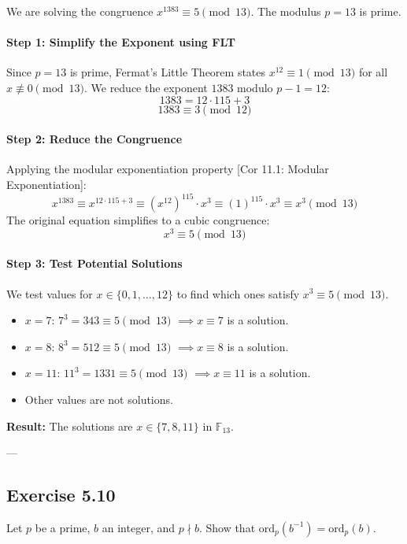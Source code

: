 \begin{solution}
We are solving the congruence $x^{1383} \equiv 5 \pmod{13}$. The modulus $p=13$ is prime.

\paragraph{Step 1: Simplify the Exponent using FLT}
Since $p=13$ is prime, Fermat's Little Theorem states $x^{12} \equiv 1 \pmod{13}$ for all $x \not\equiv 0 \pmod{13}$.
We reduce the exponent $1383$ modulo $p-1 = 12$:
$$ 1383 = 12 \cdot 115 + 3 $$
$$ 1383 \equiv 3 \pmod{12} $$

\paragraph{Step 2: Reduce the Congruence}
Applying the modular exponentiation property [Cor 11.1: Modular Exponentiation]:
$$ x^{1383} \equiv x^{12 \cdot 115 + 3} \equiv (x^{12})^{115} \cdot x^3 \equiv (1)^{115} \cdot x^3 \equiv x^3 \pmod{13} $$
The original equation simplifies to a cubic congruence:
$$ x^3 \equiv 5 \pmod{13} $$

\paragraph{Step 3: Test Potential Solutions}
We test values for $x \in \{0, 1, \dots, 12\}$ to find which ones satisfy $x^3 \equiv 5 \pmod{13}$.
\begin{itemize}
    \item $x=7$: $7^3 = 343 \equiv 5 \pmod{13}$ $\implies x \equiv 7$ is a solution.
    \item $x=8$: $8^3 = 512 \equiv 5 \pmod{13}$ $\implies x \equiv 8$ is a solution.
    \item $x=11$: $11^3 = 1331 \equiv 5 \pmod{13}$ $\implies x \equiv 11$ is a solution.
    \item Other values are not solutions.
\end{itemize}
\textbf{Result:} The solutions are $x \in \{7, 8, 11\}$ in $\mathbb{F}_{13}$.
\end{solution}

---
\subsection*{Exercise 5.10}
Let $p$ be a prime, $b$ an integer, and $p \nmid b$. Show that $\mathrm{ord}_{p}(b^{-1}) = \mathrm{ord}_{p}(b)$.


